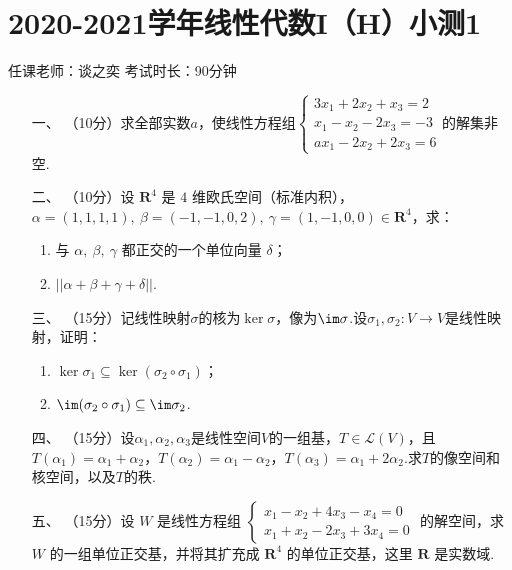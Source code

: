 \section*{2020-2021学年线性代数I（H）小测1}

\begin{center}
    任课老师：谈之奕\hspace{4em} 考试时长：90分钟
\end{center}

\begin{enumerate}
	\item[一、]（10分）求全部实数$a$，使线性方程组$\begin{cases}
        3x_1+2x_2+x_3=2 \\ x_1-x_2-2x_3=-3 \\ ax_1-2x_2+2x_3=6
    \end{cases}$的解集非空.
	\item[二、]（10分）设 $\mathbf{R}^4$ 是 $4$ 维欧氏空间（标准内积），$\alpha=(1,1,1,1),\ \beta=(-1,-1,0,2),\ \gamma=(1,-1,0,0) \in \mathbf{R}^4$，求：
    \begin{enumerate}[label=(\arabic*)]
        \item 与 $\alpha,\ \beta,\ \gamma$ 都正交的一个单位向量 $\delta$；
        \item $||\alpha+\beta+\gamma+\delta||$.
    \end{enumerate}
	\item[三、]（15分）记线性映射$\sigma$的核为$\ker\sigma$，像为$\im\sigma$.设$\sigma_1,\sigma_2:V\to V$是线性映射，证明：
	\begin{enumerate}[label=(\arabic*)]
        \item $\ker\sigma_1\subseteq\ker(\sigma_2\circ\sigma_1)$；
        \item $\im(\sigma_2\circ\sigma_1)\subseteq\im\sigma_2$.
    \end{enumerate}
	\item[四、]（15分）设$\alpha_1,\alpha_2,\alpha_3$是线性空间$V$的一组基，$T\in\mathcal{L}(V)$，且$T(\alpha_1)=\alpha_1+\alpha_2$，$T(\alpha_2)=\alpha_1-\alpha_2$，$T(\alpha_3)=\alpha_1+2\alpha_2$.求$T$的像空间和核空间，以及$T$的秩.
	\item[五、]（15分）设 $W$ 是线性方程组 $\begin{cases}
        x_1-x_2+4x_3-x_4=0 \\ x_1+x_2-2x_3+3x_4=0
    \end{cases}$ 的解空间，求 $W$ 的一组单位正交基，并将其扩充成 $\mathbf{R}^4$ 的单位正交基，这里 $\mathbf{R}$ 是实数域.

\end{enumerate}
